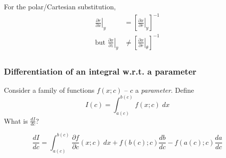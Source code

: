 \documentclass{../template/note}
\begin{document}
    \begin{example}
        For the polar/Cartesian substitution,
        \begin{align*}
            \left.\frac{\partial r}{\partial x}\right|_{y} &= \left[\left.\frac{\partial x}{\partial r}\right|_{y}\right]^{-1} \\
            \text{but } \left.\frac{\partial x}{\partial z}\right|_{y} &\neq \left[\left.\frac{\partial x}{\partial r}\right|_{\theta}\right]^{-1} \\
        \end{align*}
    \end{example}
    
    \subsubsection{Differentiation of an integral w.r.t. a parameter}

    Consider a family of functions \(f(x; c)\) -- \(c\) a \emph{parameter}. Define
    \[
        I(c) = \int_{a(c)}^{b(c)} f(x; c) \; dx
    \]
    What is \(\frac{dI}{dc}\)?

    \begin{theorem}
        \[
            \frac{dI}{dc} = \int_{a(c)}^{b(c)} \frac{\partial f}{\partial c}(x; c) \; dx + f(b(c); c)\frac{db}{dc} - f(a(c); c) \frac{da}{dc}
        \]
    \end{theorem}
    
\end{document}
